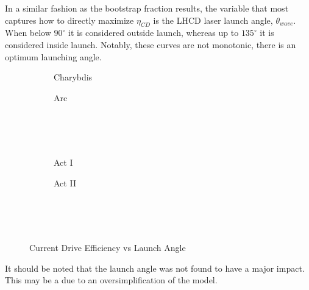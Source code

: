 In a similar fashion as the bootstrap fraction results, the variable that most captures how to directly maximize $\eta_{CD}$ is the LHCD laser launch angle, $\theta_{wave}$. When below $90 ^{\circ}$ it is considered outside launch, whereas up to $135 ^{\circ}$ it is considered inside launch. Notably, these curves are not monotonic, there is an optimum launching angle.

\begin{figure*}[h!]
    \centering
    \hfill 
    \begin{subfigure}[t]{0.4\textwidth}
        \centering
    \begin{adjustbox}{width=\textwidth}
      \Large
      
    \end{adjustbox}
        \caption{Charybdis}
    \end{subfigure}
    \hfill
    \begin{subfigure}[t]{0.4\textwidth}
        \centering
    \begin{adjustbox}{width=\textwidth}
      \Large
      
    \end{adjustbox}
        \caption{Arc}
    \end{subfigure}
    \hfill \hfill ~\\ ~\\ ~\\
    \hfill 
    \begin{subfigure}[t]{0.4\textwidth}
        \centering
    \begin{adjustbox}{width=\textwidth}
      \Large
      
    \end{adjustbox}
        \caption{Act I}
    \end{subfigure}
    \hfill
    \begin{subfigure}[t]{0.4\textwidth}
        \centering
    \begin{adjustbox}{width=\textwidth}
      \Large
      
    \end{adjustbox}
        \caption{Act II}
    \end{subfigure}
    \hfill \hfill ~\\ ~\\ ~\\
    \caption{Current Drive Efficiency vs Launch Angle}
\end{figure*}

It should be noted that the launch angle was not found to have a major impact. This may be a due to an oversimplification of the model.

%
